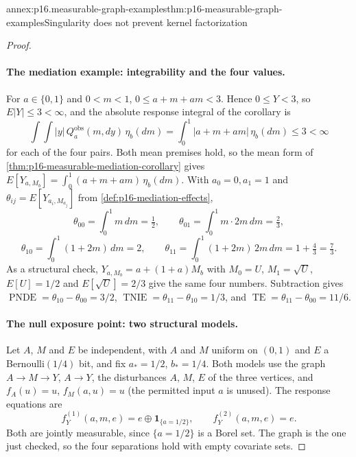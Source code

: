\begin{annexitem}{annex:p16.measurable-graph-examples}{thm:p16-measurable-graph-examples}{Singularity does not prevent kernel factorization}
\begin{proof}
\paragraph{The mediation example: integrability and the four values.}
For \(a\in\{0,1\}\) and \(0<m<1\), \(0\leq a+m+am<3\). Hence
\(0\leq Y<3\), so \(E|Y|\leq3<\infty\), and the absolute response
integral of the corollary is
\[
 \int\!\int|y|\,Q^{\mathrm{obs}}_a(m,dy)\,\eta_b(dm)
 =\int_0^1|a+m+am|\,\eta_b(dm)\leq3<\infty
\]
for each of the four pairs. Both mean premises hold, so the mean form
of \cref{thm:p16-measurable-mediation-corollary} gives
\(E[Y_{a,M_b}]=\int_0^1(a+m+am)\,\eta_b(dm)\). With \(a_0=0,a_1=1\)
and \(\theta_{ij}=E[Y_{a_i,M_{a_j}}]\) from
\cref{def:p16-mediation-effects},
\[
 \theta_{00}=\int_0^1m\,dm=\tfrac12,\qquad
 \theta_{01}=\int_0^1m\cdot2m\,dm=\tfrac23,
\]
\[
 \theta_{10}=\int_0^1(1+2m)\,dm=2,\qquad
 \theta_{11}=\int_0^1(1+2m)\,2m\,dm=1+\tfrac43=\tfrac73.
\]
As a structural check, \(Y_{a,M_b}=a+(1+a)M_b\) with \(M_0=U\),
\(M_1=\sqrt U\), \(E[U]=1/2\) and \(E[\sqrt U]=2/3\) give the same four
numbers. Subtraction gives
\(\operatorname{PNDE}=\theta_{10}-\theta_{00}=3/2\),
\(\operatorname{TNIE}=\theta_{11}-\theta_{10}=1/3\), and
\(\operatorname{TE}=\theta_{11}-\theta_{00}=11/6\).

\paragraph{The null exposure point: two structural models.}
Let \(A\), \(M\) and \(E\) be independent, with \(A\) and \(M\)
uniform on \((0,1)\) and \(E\) a Bernoulli\((1/4)\) bit, and fix
\(a_*=1/2\), \(b_*=1/4\). Both models use the graph
\(A\to M\to Y\), \(A\to Y\), the disturbances \(A\), \(M\), \(E\)
of the three vertices, and \(f_A(u)=u\), \(f_M(a,u)=u\) (the
permitted input \(a\) is unused). The response equations are
\[
 f^{(1)}_Y(a,m,e)=e\oplus\mathbf1_{\{a=1/2\}},\qquad
 f^{(2)}_Y(a,m,e)=e .
\]
Both are jointly measurable, since \(\{a=1/2\}\) is a Borel set. The
graph is the one just checked, so the four separations hold with
empty covariate sets.


\end{proof}
\end{annexitem}
